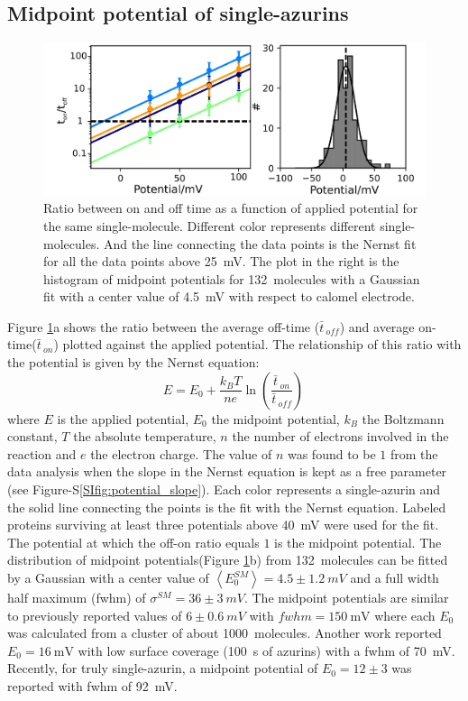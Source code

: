 \documentclass[journal=jacsat,manuscript=article]{achemso}
\newcommand*\me[1]{\ensuremath{\bar{#1}\,}}
\begin{document}
\subsection{Midpoint potential of single-azurins}
\begin{figure}
	\centering
	\includegraphics[]{Figure_2_midpoint}
	\caption{Ratio between on and off time as a function of applied potential for the same single-molecule.
	Different color represents different single-molecules.
	And the line connecting the data points is the Nernst fit for all the data points above \SI{25}{\mV}.
	The plot in the right is the histogram of midpoint potentials for \SI{132}{ molecules} with a Gaussian fit with a center value of \SI{4.5}{\mV} with respect to calomel electrode.}
	\label{fig:midpoint}
\end{figure}
Figure \ref{fig:midpoint}a shows the ratio between the average off-time ($\me{t}_{off}$) and average on-time($\me{t}_{on}$) plotted against the applied potential.
The relationship of this ratio with the potential is given by the Nernst equation: 
\begin{equation}
	E = E_0 + \frac{k_BT}{n e}\ln\left(\frac{\me{t}_{on}}{\me{t}_{off}}\right)\,
	\label{eq:nernst}
\end{equation}
where $E$ is the applied potential, $E_0$ the midpoint potential, $k_B$ the Boltzmann constant, $T$ the absolute temperature, $n$ the number of electrons involved in the reaction and $e$ the electron charge.
The value of $n$ was found to be $1$ from the data analysis when the slope in the Nernst equation is kept as a free parameter (see Figure-S\ref{SIfig:potential_slope}).
Each color represents a single-azurin and the solid line connecting the points is the fit with the Nernst equation.
Labeled proteins surviving at least three potentials above \SI{40}{\mV} were used for the fit.
The potential at which the off-on ratio equals $1$ is the midpoint potential.
The distribution of midpoint potentials(Figure \ref{fig:midpoint}b) from \SI{132}{ molecules} can be fitted by a Gaussian with a center value of $\left<E_0^{SM}\right>=4.5 \pm 1.2~mV$ and a full width half maximum (fwhm) of $\sigma^{SM}=36 \pm 3~mV$. 
The midpoint potentials are similar to previously reported values of $6\pm0.6~mV$ with $fwhm=\SI{150}{\mV}$ where each $E_0$ was calculated from a cluster of about \SI{1000}{ molecules}.\cite{davis2006monitoring}
Another work reported $E_0 = \SI{16}{\mV}$ with low surface coverage (\SI{100}{\s} of azurins) with a fwhm of \SI{70}{\mV}.\cite{salverda2010fluorescent} 
Recently, for truly single-azurin, a midpoint potential of $E_0=12\pm3$ was reported with fwhm of \SI{92}{\mV}.\cite{akkilic2014chemically-induced}\\
\end{document}
